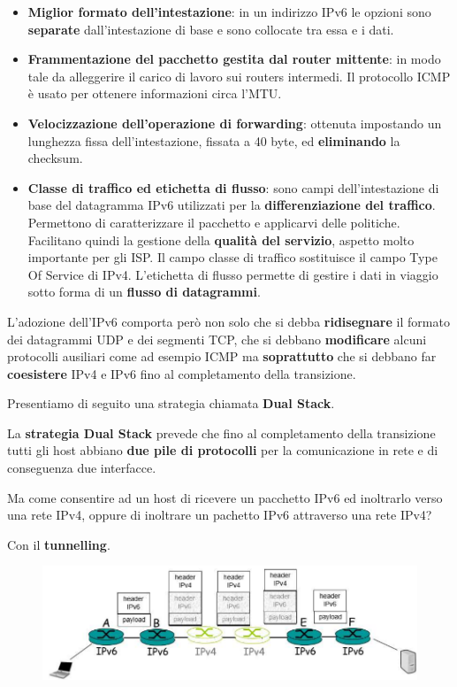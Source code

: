 \documentclass[11pt,a4paper,oneside]{book}
\theoremstyle{definition}
\begin{document}
\begin{itemize}
	\item \textbf{Miglior formato dell'intestazione}: in un indirizzo IPv6 le opzioni sono \textbf{separate} dall'intestazione di base e sono collocate tra essa e i dati.
	\item \textbf{Frammentazione del pacchetto gestita dal router mittente}: in modo tale da alleggerire il carico di lavoro sui routers intermedi. Il protocollo ICMP è usato per ottenere informazioni circa l'MTU.
	\item \textbf{Velocizzazione dell'operazione di forwarding}: ottenuta impostando un lunghezza fissa dell'intestazione, fissata a 40 byte, ed \textbf{eliminando} la checksum.
	\item \textbf{Classe di traffico ed etichetta di flusso}: sono campi dell'intestazione di base del datagramma IPv6 utilizzati per la \textbf{differenziazione del traffico}. Permettono di caratterizzare il pacchetto e applicarvi delle politiche. Facilitano quindi la gestione della \textbf{qualità del servizio}, aspetto molto importante per gli ISP. Il campo classe di traffico sostituisce il campo Type Of Service di IPv4. L'etichetta di flusso permette di gestire i dati in viaggio sotto forma di un \textbf{flusso di datagrammi}.
\end{itemize}

L'adozione dell'IPv6 comporta però non solo che si debba \textbf{ridisegnare} il formato dei datagrammi UDP e dei segmenti TCP, che si debbano \textbf{modificare} alcuni protocolli ausiliari come ad esempio ICMP ma \textbf{soprattutto} che si debbano far \textbf{coesistere} IPv4 e IPv6 fino al completamento della transizione.

\pagebreak

Presentiamo di seguito una strategia chiamata \textbf{Dual Stack}.

La \textbf{strategia Dual Stack} prevede che fino al completamento della transizione tutti gli host abbiano \textbf{due pile di protocolli} per la comunicazione in rete e di conseguenza due interfacce.

Ma come consentire ad un host di ricevere un pacchetto IPv6 ed inoltrarlo verso una rete IPv4, oppure di inoltrare un pachetto IPv6 attraverso una rete IPv4?

Con il \textbf{tunnelling}.

\begin{figure}[!h]
	\centering
	\includegraphics[scale=0.45]{Immagini/Tunnelling.png}
\end{figure}
\end{document}
